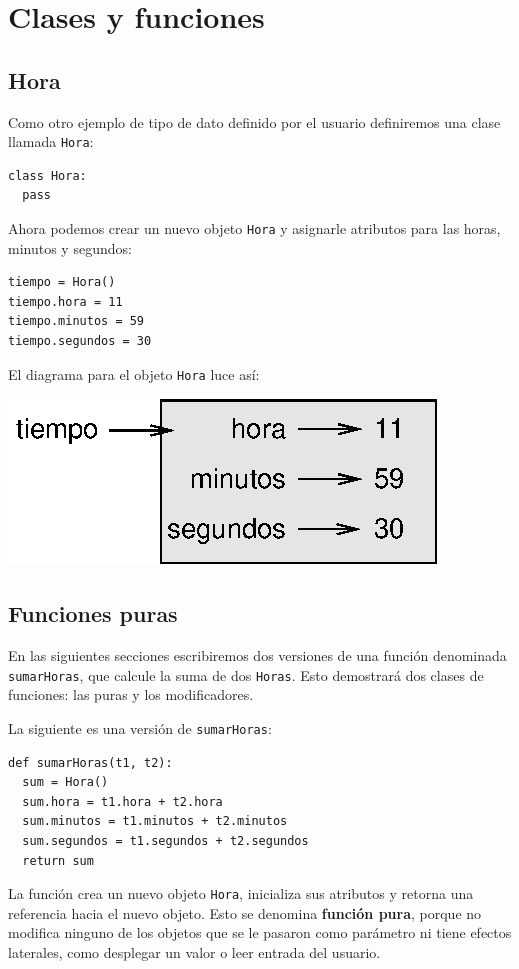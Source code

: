 
\chapter{Clases y funciones}

\label{time}  

\section{Hora}

Como otro ejemplo de tipo de dato definido por el usuario definiremos
una clase llamada \texttt{Hora}:
\begin{verbatim}
class Hora:
  pass
\end{verbatim}

Ahora podemos crear un nuevo objeto \texttt{Hora} y asignarle atributos
para las horas, minutos y segundos:
\begin{verbatim}
tiempo = Hora()
tiempo.hora = 11
tiempo.minutos = 59
tiempo.segundos = 30
\end{verbatim}

El diagrama para el objeto \texttt{Hora} luce así:

\beforefig \centerline{\includegraphics{illustrations/time}} \afterfig

\section{Funciones puras}

 

En las siguientes secciones escribiremos dos versiones de una función
denominada \texttt{sumarHoras}, que calcule la suma de dos \texttt{Horas}.
Esto demostrará dos clases de funciones: las puras y los modificadores.

La siguiente es una versión de \texttt{sumarHoras}:

\begin{verbatim}
def sumarHoras(t1, t2):
  sum = Hora()
  sum.hora = t1.hora + t2.hora
  sum.minutos = t1.minutos + t2.minutos
  sum.segundos = t1.segundos + t2.segundos
  return sum
\end{verbatim}
 La función crea un nuevo objeto \texttt{Hora}, inicializa sus atributos
y retorna una referencia hacia el nuevo objeto. Esto se denomina \textbf{función
pura}, porque no modifica ninguno de los objetos que se le pasaron
como parámetro ni tiene efectos laterales, como desplegar un valor
o leer entrada del usuario.

